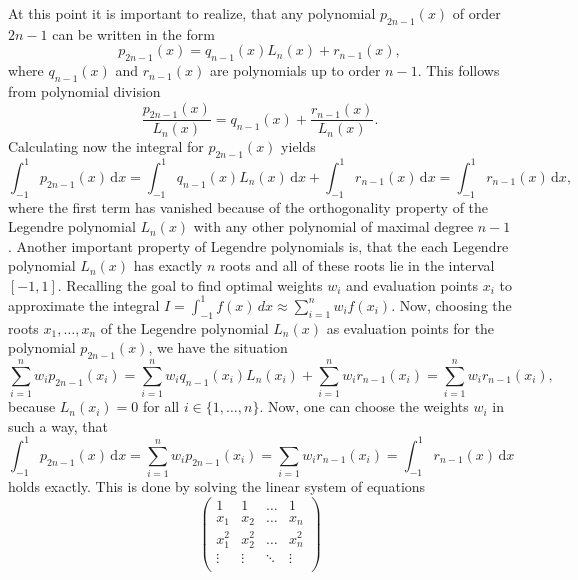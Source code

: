\documentclass[a4paper,11pt]{article}
\numberwithin{equation}{section}
\begin{document}
{At this point it is important to realize, that any polynomial $p_{2n-1}(x)$ of order $2n-1$ can be written in the form \begin{equation}
	p_{2n-1}(x) = q_{n-1}(x)L_n(x) + r_{n-1}(x),
\end{equation} where $q_{n-1}(x)$ and $r_{n-1}(x)$ are polynomials up to order $n-1$. This follows from polynomial division \begin{equation}
\frac{p_{2n-1}(x)}{L_n(x)} = q_{n-1}(x) + \frac{r_{n-1}(x)}{L_n(x)}.
\end{equation} Calculating now the integral for $p_{2n-1}(x)$ yields \begin{equation}
\int_{-1}^{1}p_{2n-1}(x)\,\mathrm{d}x = \int_{-1}^{1}q_{n-1}(x)L_n(x)\,\mathrm{d}x + \int_{-1}^{1} r_{n-1}(x)\,\mathrm{d}x = \int_{-1}^{1} r_{n-1}(x)\,\mathrm{d}x,
\end{equation} where the first term has vanished because of the orthogonality property of the Legendre polynomial $L_n(x)$ with any other polynomial of maximal degree $n-1$. Another important property of Legendre polynomials is, that the each Legendre polynomial $L_n(x)$ has exactly $n$ roots and all of these roots lie in the interval $[-1,1]$. Recalling the goal to find optimal weights $w_i$ and evaluation points $x_i$ to approximate the integral $I = \int_{-1}^{1} f(x) \,dx \approx \sum_{i=1}^{n}w_if(x_i)$. Now, choosing the roots $x_1,\dots,x_n$ of the Legendre polynomial $L_n(x)$ as evaluation points for the polynomial $p_{2n-1}(x)$, we have the situation \begin{equation}
\sum_{i=1}^n w_ip_{2n-1}(x_i) = \sum_{i=1}^n w_i q_{n-1}(x_i)L_n(x_i) + \sum_{i=1}^n w_i r_{n-1}(x_i) = \sum_{i=1}^n w_i r_{n-1}(x_i),
\end{equation} because $L_n(x_i) = 0$ for all $i \in \{1,\dots,n\}$. Now, one can choose the weights $w_i$ in such a way, that \begin{equation}
\int_{-1}^1 p_{2n-1}(x)\,\mathrm{d}x = \sum_{i=1}^n w_ip_{2n-1}(x_i) = \sum_{i=1}w_ir_{n-1}(x_i) = \int_{-1}^{1}r_{n-1}(x)\,\mathrm{d}x
\end{equation} holds exactly. This is done by solving the linear system of equations \begin{equation}\label{eq:vandermode_equation}
\begin{pmatrix}
	1 & 1 & \dots & 1 \\
	x_1 & x_2 & \dots & x_n \\
	x_1^2 & x_2^2 & \dots & x_n^2 \\
	\vdots & \vdots & \ddots & \vdots \\

\end{pmatrix}
\end{equation}}
\end{document}

